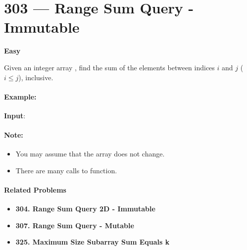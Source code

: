 \section{303 --- Range Sum Query - Immutable}

\textbf{Easy}

Given an integer array , find the sum of the elements between indices $i$ and $j$ ($i \leq j$), inclusive.

\paragraph{Example:}

\begin{flushleft}
\textbf{Input}:  



\end{flushleft}

\paragraph{Note:}
\begin{itemize}
\item You may assume that the array does not change.
\item There are many calls to  function.
\end{itemize}

\paragraph{Related Problems}
\begin{itemize}
\item \textbf{304. Range Sum Query 2D - Immutable}
\item \textbf{307. Range Sum Query - Mutable}
\item \textbf{325. Maximum Size Subarray Sum Equals k}
\end{itemize}